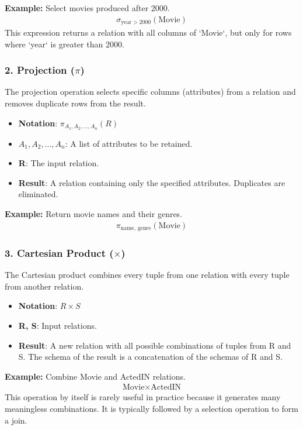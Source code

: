 \documentclass{article}
\newcommand{\sel}{\sigma} %
\newcommand{\proj}{\pi} %
\begin{document}
\textbf{Example:} Select movies produced after 2000.
\begin{align*}
    \sel_{\text{year} > 2000}(\text{Movie}) \tag{1} \label{eq:sel_movie_year} \text{}
\end{align*}
This expression returns a relation with all columns of `Movie`, but only for rows where `year` is greater than 2000.

\subsubsection*{2. Projection ($\proj$)}
The projection operation selects specific columns (attributes) from a relation and removes duplicate rows from the result.
\begin{itemize}
    \item \textbf{Notation}: $\proj_{A_1, A_2, ..., A_n}(R)$ 
    \item \textbf{$A_1, A_2, ..., A_n$}: A list of attributes to be retained.
    \item \textbf{R}: The input relation.
    \item \textbf{Result}: A relation containing only the specified attributes. Duplicates are eliminated.
\end{itemize}

\textbf{Example:} Return movie names and their genres.
\begin{align*}
    \proj_{\text{name, genre}}(\text{Movie}) \tag{2} \label{eq:proj_movie_name_genre} \text{}
\end{align*}

\subsubsection*{3. Cartesian Product ($\times$)}
The Cartesian product combines every tuple from one relation with every tuple from another relation.
\begin{itemize}
    \item \textbf{Notation}: $R \times S$ 
    \item \textbf{R, S}: Input relations.
    \item \textbf{Result}: A new relation with all possible combinations of tuples from R and S. The schema of the result is a concatenation of the schemas of R and S.
\end{itemize}

\textbf{Example:} Combine Movie and ActedIN relations.
\begin{align*}
    \text{Movie} \times \text{ActedIN} \tag{3} \label{eq:cartesian_product} \text{}
\end{align*}
This operation by itself is rarely useful in practice because it generates many meaningless combinations. It is typically followed by a selection operation to form a join.
\end{document}
